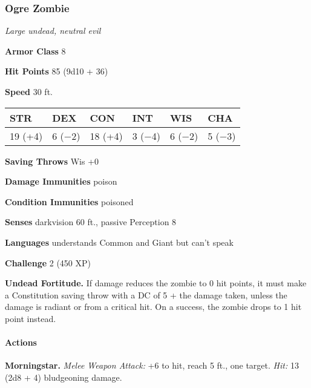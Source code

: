 \documentclass[
]{article}
\begin{document}
\hypertarget{ogre-zombie}{%
\subsubsection{Ogre Zombie}\label{ogre-zombie}}

\emph{Large undead, neutral evil}

\textbf{Armor Class} 8

\textbf{Hit Points} 85 (9d10 + 36)

\textbf{Speed} 30 ft.

\begin{longtable}[]{@{}llllll@{}}
\toprule
STR & DEX & CON & INT & WIS & CHA\tabularnewline
\midrule
\endhead
19 (+4) & 6 (−2) & 18 (+4) & 3 (−4) & 6 (−2) & 5 (−3)\tabularnewline
\bottomrule
\end{longtable}

\textbf{Saving Throws} Wis +0

\textbf{Damage Immunities} poison

\textbf{Condition Immunities} poisoned

\textbf{Senses} darkvision 60 ft., passive Perception 8

\textbf{Languages} understands Common and Giant but can't speak

\textbf{Challenge} 2 (450 XP)

\textbf{Undead Fortitude.} If damage reduces the zombie to 0 hit points,
it must make a Constitution saving throw with a DC of 5 + the damage
taken, unless the damage is radiant or from a critical hit. On a
success, the zombie drops to 1 hit point instead.

\hypertarget{actions-1}{%
\paragraph{Actions}\label{actions-1}}

\textbf{Morningstar.} \emph{Melee Weapon Attack:} +6 to hit, reach 5
ft., one target. \emph{Hit:} 13 (2d8 + 4) bludgeoning damage.
\end{document}
